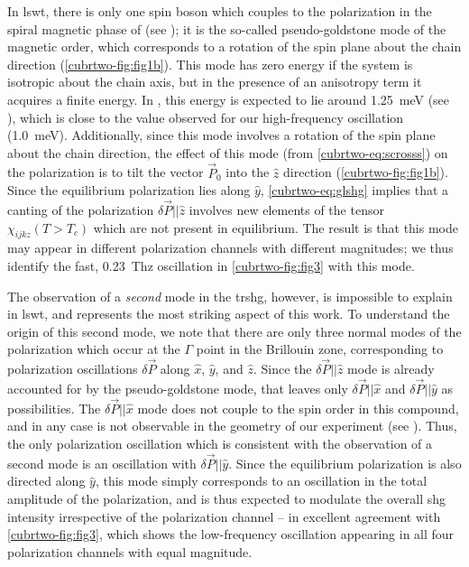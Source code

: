 In \gls{lswt}, there is only one spin boson which couples to the polarization in the spiral magnetic phase of  (see ); it is the so-called pseudo-goldstone mode of the magnetic order\cite{katsura_dynamical_2007}, which corresponds to a rotation of the spin plane about the chain direction (\cref{cubrtwo-fig:fig1b}).
This mode has zero energy if the system is isotropic about the chain axis, but in the presence of an anisotropy term it acquires a finite energy.
In , this energy is expected to lie around \qty{1.25}{meV} (see ), which is close to the value observed for our high-frequency oscillation (\qty{1.0}{meV}).
Additionally, since this mode involves a rotation of the spin plane about the chain direction, the effect of this mode (from \cref{cubrtwo-eq:scrosss}) on the polarization is to tilt the vector $\vec{P}_0$ into the $\hat{z}$ direction (\cref{cubrtwo-fig:fig1b}).
Since the equilibrium polarization lies along $\hat{y}$, \cref{cubrtwo-eq:glshg} implies that a canting of the polarization $\delta \vec{P} || \hat{z}$ involves new elements of the tensor $\chi_{ijkz}(T>T_c)$ which are not present in equilibrium.
The result is that this mode may appear in different polarization channels with different magnitudes; we thus identify the fast, \qty{0.23}{Thz} oscillation in \cref{cubrtwo-fig:fig3} with this mode.

The observation of a \emph{second} mode in the \gls{trshg}, however, is impossible to explain in \gls{lswt}, and represents the most striking aspect of this work.
To understand the origin of this second mode, we note that there are only three normal modes of the polarization which occur at the $\Gamma$ point in the Brillouin zone, corresponding to polarization oscillations $\delta\vec{P}$ along $\hat{x}$, $\hat{y}$, and $\hat{z}$.
Since the $\delta\vec{P} || \hat{z}$ mode is already accounted for by the pseudo-goldstone mode, that leaves only $\delta\vec{P} || \hat{x}$ and $\delta\vec{P} || \hat{y}$ as possibilities.
The $\delta\vec{P} || \hat{x}$ mode does not couple to the spin order in this compound\cite{katsura_dynamical_2007}, and in any case is not observable in the geometry of our experiment (see ).
Thus, the only polarization oscillation which is consistent with the observation of a second mode is an oscillation with $\delta\vec{P} || \hat{y}$.
Since the equilibrium polarization is also directed along $\hat{y}$, this mode simply corresponds to an oscillation in the total amplitude of the polarization, and is thus expected to modulate the overall \gls{shg} intensity irrespective of the polarization channel -- in excellent agreement with \cref{cubrtwo-fig:fig3}, which shows the low-frequency oscillation appearing in all four polarization channels with equal magnitude.

